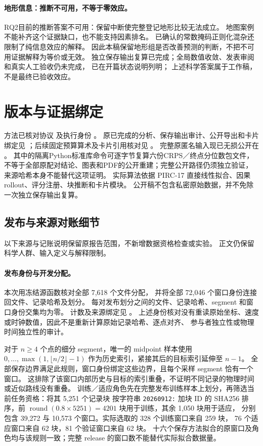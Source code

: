 \documentclass[UTF8,11pt]{ctexart}
\begin{document}
\paragraph{地形信息：推断不可用，不等于零效应。}
RQ2目前的推断答案不可用：保留中断使完整登记地形比较无法成立。
地图案例不能补齐这个证据缺口，也不能支持因素排名。
已确认的常数掩码正则化混杂还限制了纯信息效应的解释。
因此本稿保留地形组是否改善预测的判断，不把不可用证据解释为等价或无效。
独立保存输出复算已完成；全局数值收敛、发表审阅和真实人工验收仍未完成，
已在开篇状态说明列明；
上述科学答案属于工作稿，不是最终已验收效应。

\appendix
\section{版本与证据绑定}
方法已核对协议
及执行身份
。
原已完成的分析、保存输出审计、公开导出和卡片绑定见
；后续固定预算算术及卡片引用核对见
。
完整原匿名输入现已无损公开在 。
其中的隔离Python标准库命令可逐字节复算六份CRPS／终点分位数包文件，
不等于全部原配对结论、图表和PDF的公开重建；完整公开路径仍须独立验证，
来源哈希本身不能替代这项证明。
实际算法依据 PIRC-17 直接线性拟合、因果 rollout、评分注册、块推断和卡片模块。
公开稿不包含私密原始数据，并不免除一次独立保存输出复算。

\subsection{发布与来源对账细节}
\label{sec:source-reconciliation-details}
以下来源与记账说明保留原报告范围，不新增数据资格检查或实验。
正文仍保留科学人群、输入定义与解释限制。

\paragraph{发布身份与开发分配。}
本次用冻结源函数核对全部 7,618 个文件分配，
并将全部 72,046 个窗口身份连接回文件、记录哈希及划分。
每对发布划分之间的文件、记录哈希、segment 和窗口身份交集均为零。
计数及来源绑定见 。
上述身份核对没有重读原始坐标、速度或时钟数值，因此不是重新计算原始记录哈希、逐点对齐、
参与者独立性或物理时间独立性的审计。

对于 \(n\geq4\) 个点的细分 segment，唯一的 midpoint 样本使用
\(0,\ldots,\max(1,\lfloor n/2\rfloor-1)\) 作为历史索引，紧接其后的目标索引延伸至 \(n-1\)。
全部保存边界满足此规则，窗口身份绑定这些边界，且每个采样 segment 恰有一个窗口。
这排除了该窗口内部历史与目标的索引重叠，不证明不同记录的物理时间或近似路线没有重叠。
训练／适应角色先在完整发布训练样本上划分，再筛选当前任务资格：将其 5,251 个记录块
按字符串 \texttt{20260912:} 加块 ID 的 SHA256 排序，前
\(\operatorname{round}(0.8\times5251)=4201\) 块用于训练，其余 1,050 块用于适应，
分别包含 39,272 与 10,573 个窗口。实际选取的 328 个训练窗口来自 259 块，
76 个适应窗口来自 62 块，81 个验证窗口来自 62 块。
十六个保存方法拟合的原窗口及角色均与该规则一致；完整 release 的窗口数不能替代实际拟合数据量。
\end{document}
